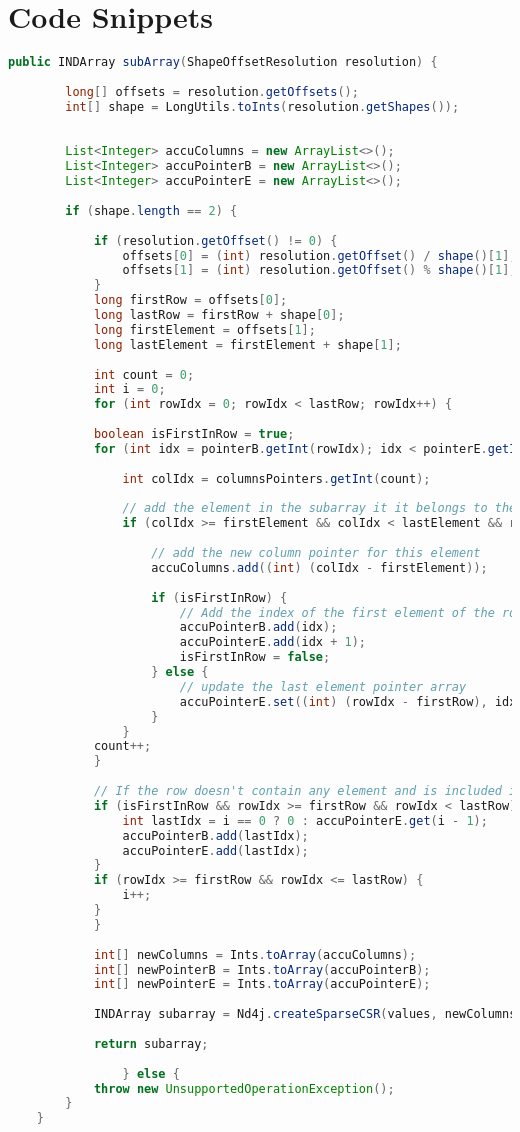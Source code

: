 \appendix
\chapter{Code Snippets}

\begin{lstlisting}[caption=Extract a sub-array of a CSR matrix\label{lst:getcsc},language=Java]
	public INDArray subArray(ShapeOffsetResolution resolution) {
	
		long[] offsets = resolution.getOffsets();
		int[] shape = LongUtils.toInts(resolution.getShapes());
		
		
		List<Integer> accuColumns = new ArrayList<>();
		List<Integer> accuPointerB = new ArrayList<>();
		List<Integer> accuPointerE = new ArrayList<>();
		
		if (shape.length == 2) {
			
			if (resolution.getOffset() != 0) {
				offsets[0] = (int) resolution.getOffset() / shape()[1];
				offsets[1] = (int) resolution.getOffset() % shape()[1];
			}
			long firstRow = offsets[0];
			long lastRow = firstRow + shape[0];
			long firstElement = offsets[1];
			long lastElement = firstElement + shape[1];
			
			int count = 0;
			int i = 0;
			for (int rowIdx = 0; rowIdx < lastRow; rowIdx++) {
			
			boolean isFirstInRow = true;
			for (int idx = pointerB.getInt(rowIdx); idx < pointerE.getInt(rowIdx); idx++) {
			
				int colIdx = columnsPointers.getInt(count);
				
				// add the element in the subarray it it belongs to the view
				if (colIdx >= firstElement && colIdx < lastElement && rowIdx >= firstRow && rowIdx < lastRow) {
				
					// add the new column pointer for this element
					accuColumns.add((int) (colIdx - firstElement));
					
					if (isFirstInRow) {
						// Add the index of the first element of the row in the pointer array
						accuPointerB.add(idx);
						accuPointerE.add(idx + 1);
						isFirstInRow = false;
					} else {
						// update the last element pointer array
						accuPointerE.set((int) (rowIdx - firstRow), idx + 1);
					}
				}
			count++;
			}
			
			// If the row doesn't contain any element and is included in the selected rows
			if (isFirstInRow && rowIdx >= firstRow && rowIdx < lastRow) {
				int lastIdx = i == 0 ? 0 : accuPointerE.get(i - 1);
				accuPointerB.add(lastIdx);
				accuPointerE.add(lastIdx);
			}
			if (rowIdx >= firstRow && rowIdx <= lastRow) {
				i++;
			}
			}
			
			int[] newColumns = Ints.toArray(accuColumns);
			int[] newPointerB = Ints.toArray(accuPointerB);
			int[] newPointerE = Ints.toArray(accuPointerE);
			
			INDArray subarray = Nd4j.createSparseCSR(values, newColumns, newPointerB, newPointerE, shape);
			
			return subarray;
			
				} else {
			throw new UnsupportedOperationException();
		}
	}
\end{lstlisting}
